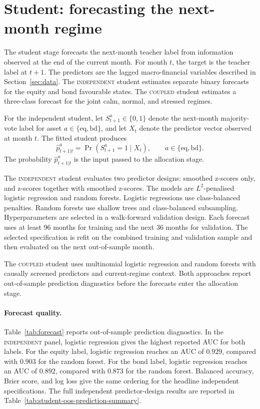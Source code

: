 \documentclass[10pt]{article}
\newcommand{\Acoup}{\textsc{coupled}}
\newcommand{\Bindep}{\textsc{independent}}
\begin{document}
\section{Student: forecasting the next-month regime}
\label{sec:student}

The student stage forecasts the next-month teacher label from information observed at the
end of the current month. For month \(t\), the target is the teacher label at \(t+1\). The
predictors are the lagged macro-financial variables described in Section~\ref{sec:data}. The
\Bindep{} student estimates separate binary forecasts for the equity and bond favourable
states. The \Acoup{} student estimates a three-class forecast for the joint calm, normal, and
stressed regimes.

For the independent student, let \(S^a_{t+1}\in\{0,1\}\) denote the next-month majority-vote
label for asset \(a\in\{\mathrm{eq},\mathrm{bd}\}\), and let \(X_t\) denote the predictor
vector observed at month \(t\). The fitted student produces
\begin{equation}
\hat p^a_{t+1|t}
=
\Pr\!\left(S^a_{t+1}=1\mid X_t\right),
\qquad a\in\{\mathrm{eq},\mathrm{bd}\}.
\label{eq:independent-student-probability}
\end{equation}
The probability \(\hat p^a_{t+1|t}\) is the input passed to the allocation stage.

The \Bindep{} student evaluates two predictor designs: smoothed z-scores only, and z-scores
together with smoothed z-scores. The models are \(L^2\)-penalised logistic regression and
random forests. Logistic regressions use class-balanced penalties. Random forests use shallow
trees and class-balanced subsampling. Hyperparameters are selected in a walk-forward
validation design. Each forecast uses at least 96 months for training and the next 36 months
for validation. The selected specification is refit on the combined training and validation
sample and then evaluated on the next out-of-sample month.

The \Acoup{} student uses multinomial logistic regression and random forests with causally
screened predictors and current-regime context. Both approaches report
out-of-sample prediction diagnostics before the forecasts enter the allocation stage.

\paragraph{Forecast quality.}
Table~\ref{tab:forecast} reports out-of-sample prediction diagnostics. In the \Bindep{}
panel, logistic regression gives the highest reported AUC for both labels. For the equity
label, logistic regression reaches an AUC of \(0.929\), compared with \(0.903\) for the
random forest. For the bond label, logistic regression reaches an AUC of \(0.892\), compared
with \(0.873\) for the random forest. Balanced accuracy, Brier score, and log loss give the
same ordering for the headline independent specifications. The full independent
predictor-design results are reported in Table~\ref{tab:student-oos-prediction-summary}.
\end{document}
